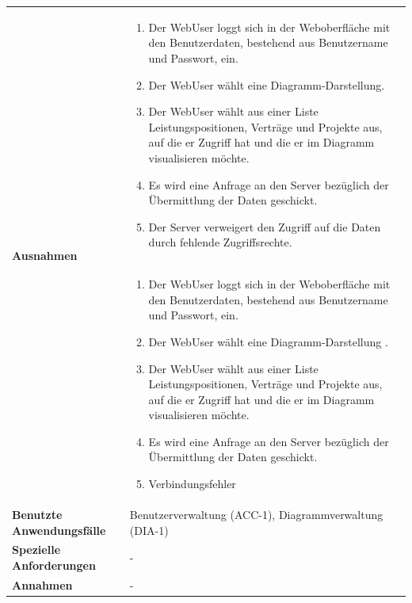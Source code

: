 \begin{longtable}[c]{|p{4cm}|p{10cm}|}
    \multirow{2}{*}{\textbf{Ausnahmen}} &
    \begin{enumerate} %
        \item Der WebUser loggt sich in der Weboberfläche mit den Benutzerdaten, bestehend aus Benutzername und Passwort, ein.
        \item Der WebUser wählt eine Diagramm-Darstellung.
        \item Der WebUser wählt aus einer Liste Leistungspositionen, Verträge und Projekte aus, auf die er Zugriff hat und die er im Diagramm visualisieren möchte.
        \item Es wird eine Anfrage an den Server bezüglich der Übermittlung der Daten geschickt.
        \item Der Server verweigert den Zugriff auf die Daten durch fehlende Zugriffsrechte.
    \end{enumerate}                                                                                                                                                                                                                                 \\\cline{2-2} &
    \begin{enumerate} %
        \item Der WebUser loggt sich in der Weboberfläche mit den Benutzerdaten, bestehend aus Benutzername und Passwort, ein.
        \item Der WebUser wählt eine Diagramm-Darstellung .
        \item Der WebUser wählt aus einer Liste Leistungspositionen, Verträge und Projekte aus, auf die er Zugriff hat und die er im Diagramm visualisieren möchte.
        \item Es wird eine Anfrage an den Server bezüglich der Übermittlung der Daten geschickt.
        \item Verbindungsfehler
    \end{enumerate}                                                                                                                                                                                                                                 \\ \hline
    \textbf{Benutzte Anwendungsfälle}   & Benutzerverwaltung (ACC-1), Diagrammverwaltung (DIA-1)                                                                                                                                                               \\ \hline
    \textbf{Spezielle Anforderungen}    & -                                                                                                                                                                                                                    \\ \hline
    \textbf{Annahmen}                   & -                                                                                                                                                                                                                    \\ \hline
\end{longtable}